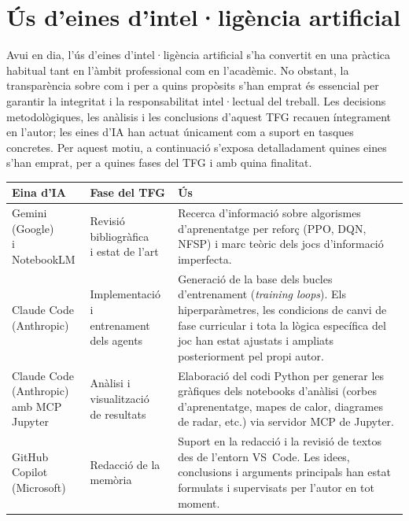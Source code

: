 
\chapter{Ús d'eines d'intel·ligència artificial}
\label{ann:ia}

Avui en dia, l'ús d'eines d'intel·ligència artificial s'ha convertit en una pràctica
habitual tant en l'àmbit professional com en l'acadèmic. No obstant, la transparència
sobre com i per a quins propòsits s'han emprat és essencial per garantir la integritat
i la responsabilitat intel·lectual del treball. Les decisions metodològiques, les
anàlisis i les conclusions d'aquest TFG recauen íntegrament en l'autor; les eines
d'IA han actuat únicament com a suport en tasques concretes. Per aquest motiu,
a continuació s'exposa detalladament quines eines s'han emprat, per a quines fases
del TFG i amb quina finalitat.

\renewcommand{\arraystretch}{1.5}
\noindent
\begin{tabular}{@{} l @{\hspace{0.4cm}} l @{\hspace{0.4cm}} l @{}}
  \toprule
  \textbf{Eina d'IA} & \textbf{Fase del TFG} & \textbf{Ús} \\
  \midrule
  \parbox[t]{3.4cm}{Gemini (Google)\\i NotebookLM} &
  \parbox[t]{4cm}{Revisió bibliogràfica\\i estat de l'art} &
  \parbox[t]{7.2cm}{Recerca d'informació sobre algorismes d'aprenentatge per reforç
  (\acs{PPO}, \acs{DQN}, \acs{NFSP}) i marc teòric dels jocs d'informació imperfecta.} \\[30pt]

  \parbox[t]{3.4cm}{Claude Code\\(Anthropic)} &
  \parbox[t]{4cm}{Implementació i\\entrenament dels agents} &
  \parbox[t]{7.2cm}{Generació de la base dels bucles d'entrenament (\emph{training loops}).
  Els hiperparàmetres, les condicions de canvi de fase curricular i tota la lògica
  específica del joc han estat ajustats i ampliats posteriorment pel propi autor.} \\[42pt]

  \parbox[t]{3.4cm}{Claude Code\\(Anthropic)\\amb MCP Jupyter} &
  \parbox[t]{4cm}{Anàlisi i visualització\\de resultats} &
  \parbox[t]{7.2cm}{Elaboració del codi Python per generar les gràfiques dels notebooks
  d'anàlisi (corbes d'aprenentatge, mapes de calor, diagrames de radar, etc.)
  via servidor MCP de Jupyter.} \\[30pt]

  \parbox[t]{3.4cm}{GitHub Copilot\\(Microsoft)} &
  \parbox[t]{4cm}{Redacció de la memòria} &
  \parbox[t]{7.2cm}{Suport en la redacció i la revisió de textos des de l'entorn
  VS~Code. Les idees, conclusions i arguments principals han estat formulats i
  supervisats per l'autor en tot moment.} \\[4pt]
  \bottomrule
\end{tabular}
\renewcommand{\arraystretch}{1}

